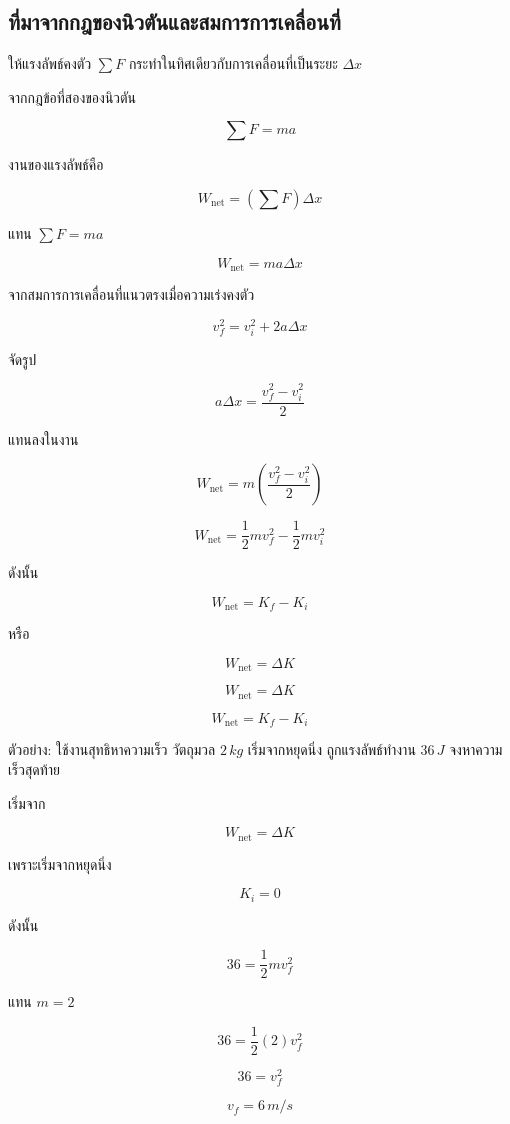 \subsection{ที่มาจากกฎของนิวตันและสมการการเคลื่อนที่}

ให้แรงลัพธ์คงตัว $\sum F$ กระทำในทิศเดียวกับการเคลื่อนที่เป็นระยะ $\Delta x$

จากกฎข้อที่สองของนิวตัน

\[
\sum F=ma
\]

งานของแรงลัพธ์คือ

\[
W_{\text{net}}=(\sum F)\Delta x
\]

แทน $\sum F=ma$

\[
W_{\text{net}}=ma\Delta x
\]

จากสมการการเคลื่อนที่แนวตรงเมื่อความเร่งคงตัว

\[
v_f^2=v_i^2+2a\Delta x
\]

จัดรูป

\[
a\Delta x=\frac{v_f^2-v_i^2}{2}
\]

แทนลงในงาน

\[
W_{\text{net}}=m\left(\frac{v_f^2-v_i^2}{2}\right)
\]

\[
W_{\text{net}}=\frac{1}{2}mv_f^2-\frac{1}{2}mv_i^2
\]

ดังนั้น

\[
W_{\text{net}}=K_f-K_i
\]

หรือ

\[
W_{\text{net}}=\Delta K
\]

\begin{tcolorbox}[title=ทฤษฎีบทงานและพลังงานจลน์]
\[
W_{\text{net}}=\Delta K
\]

\[
W_{\text{net}}=K_f-K_i
\]
\end{tcolorbox}

\begin{examplebox}{ตัวอย่าง: ใช้งานสุทธิหาความเร็ว}
วัตถุมวล $2\,\si{kg}$ เริ่มจากหยุดนิ่ง ถูกแรงลัพธ์ทำงาน $36\,\si{J}$ จงหาความเร็วสุดท้าย

เริ่มจาก

\[
W_{\text{net}}=\Delta K
\]

เพราะเริ่มจากหยุดนิ่ง

\[
K_i=0
\]

ดังนั้น

\[
36=\frac{1}{2}mv_f^2
\]

แทน $m=2$

\[
36=\frac{1}{2}(2)v_f^2
\]

\[
36=v_f^2
\]

\[
v_f=6\,\si{m/s}
\]
\end{examplebox}

